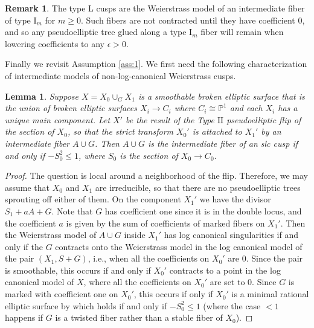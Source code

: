 \documentclass[11pt]{amsart}
\newtheorem{lemma}[theorem]{Lemma}
\theoremstyle{definition}
\newtheorem{remark}[theorem]{Remark}
\theoremstyle{remark}
\newcommand{\mb}[1]{\mathbb{#1}}
\begin{document}
	\begin{remark}\label{obs2}The type L cusps are the Weierstrass model of an intermediate fiber of type $\mathrm{I}_m$ for $m \geq 0$. Such fibers are not contracted until they have coefficient 0, and so any pseudoelliptic tree glued along a type $\mathrm{I}_m$ fiber will remain when lowering coefficients to any $\epsilon > 0$. \end{remark}
	
	Finally we revisit Assumption \ref{ass:1}. We first need the following characterization of intermediate models of non-log-canonical Weierstrass cusps. 
	
	\begin{lemma} \label{lem:nonlc} Suppose $X = X_0 \cup_G X_1$ is a smoothable broken elliptic surface that is the union of broken elliptic surfaces $X_i \to C_i$ where $C_i \cong \mb{P}^1$ and each $X_i$ has a unique main component. Let $X'$ be the result of the Type $\mathrm{II}$ pseudoelliptic flip of the section of $X_0$, so that the strict transform $X_0'$ is attached to $X_1'$ by an intermediate fiber $A \cup G$. Then $A \cup G$ is the intermediate fiber of an slc cusp if and only if $-S_0^2 \le 1$, where $S_0$ is the section of $X_0 \to C_0$. 
	\end{lemma} 
	
	\begin{proof} The question is local around a neighborhood of the flip. Therefore, we may assume that $X_0$ and $X_1$ are irreducible, so that there are no pseudoelliptic trees sprouting off either of them. On the component $X_1'$ we have the divisor $S_1 + aA + G$. Note that $G$ has coefficient one since it is in the double locus, and the coefficient $a$ is given by the sum of coefficients of marked fibers on $X_1'$. Then the Weierstrass model of $A \cup G$ inside $X_1'$ has log canonical singularities if and only if the $G$ contracts onto the Weierstrass model in the log canonical model of the pair $(X_1, S + G)$, i.e., when all the coefficients on $X_0'$ are $0$. Since the pair is smoothable, this occurs if and only if $X_0'$ contracts to a point in the log canonical model of $X$, where all the coefficients on $X_0'$ are set to $0$. Since $G$ is marked with coefficient one on $X_0'$, this occurs if only if $X_0'$ is a minimal rational elliptic surface by \cite[Proposition 7.4]{calculations} which holds if and only if $-S_0^2 \le 1$ (where the case $< 1$ happens if $G$ is a twisted fiber rather than a stable fiber of $X_0$). 
	\end{proof} 
	
\end{document}
